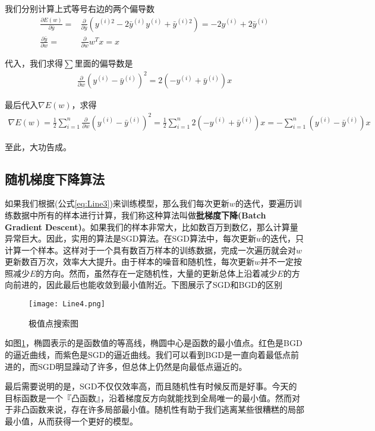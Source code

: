 我们分别计算上式等号右边的两个偏导数
\begin{align*}
	\frac{\partial{E({w})}}{\partial\bar{y}}=
	 & \frac{\partial}{\partial\bar{y}}(y^{(i)2}-2\bar{y}^{(i)}y^{(i)}+\bar{y}^{(i)2}) = -2y^{(i)}+2\bar{y}^{(i)} \\
	\frac{\partial{\bar{y}}}{\partial{w}}=
	 & \frac{\partial}{\partial{w}}{w}^T{x}= {x}
\end{align*}


代入，我们求得\(\sum\)里面的偏导数是
\begin{align*}
	\frac{\partial}{\partial{w}}(y^{(i)}-\bar{y}^{(i)})^2 = 2(-y^{(i)}+\bar{y}^{(i)}){x}
\end{align*}


最后代入\(\nabla{E}({w})\)，求得
\begin{align*}
	\nabla{E({w})} =\frac{1}{2}\sum_{i=1}^{n}\frac{\partial}{\partial{w}}(y^{(i)}-\bar{y}^{(i)})^2 =\frac{1}{2}\sum_{i=1}^{n}2(-y^{(i)}+\bar{y}^{(i)}){x} =-\sum_{i=1}^{n}(y^{(i)}-\bar{y}^{(i)}){x}
\end{align*}


至此，大功告成。

\subsection{随机梯度下降算法}\label{Line:7}

如果我们根据(公式\ref{eq:Line3})来训练模型，那么我们每次更新\({w}\)的迭代，要遍历训练数据中所有的样本进行计算，我们称这种算法叫做\textbf{批梯度下降(Batch Gradient Descent)}。如果我们的样本非常大，比如数百万到数亿，那么计算量异常巨大。因此，实用的算法是SGD算法。在SGD算法中，每次更新\({w}\)的迭代，只计算一个样本。这样对于一个具有数百万样本的训练数据，完成一次遍历就会对\({w}\)更新数百万次，效率大大提升。由于样本的噪音和随机性，每次更新\({w}\)并不一定按照减少\(E\)的方向。然而，虽然存在一定随机性，大量的更新总体上沿着减少\(E\)的方向前进的，因此最后也能收敛到最小值附近。下图展示了SGD和BGD的区别

\begin{figure}[htbp]
	\centering
	\texttt{[image: Line4.png]}
	\caption{极值点搜索图}
	\label{fig:Line4}
\end{figure}

如图\ref{fig:Line4}，椭圆表示的是函数值的等高线，椭圆中心是函数的最小值点。红色是BGD的逼近曲线，而紫色是SGD的逼近曲线。我们可以看到BGD是一直向着最低点前进的，而SGD明显躁动了许多，但总体上仍然是向最低点逼近的。

最后需要说明的是，SGD不仅仅效率高，而且随机性有时候反而是好事。今天的目标函数是一个『凸函数』，沿着梯度反方向就能找到全局唯一的最小值。然而对于非凸函数来说，存在许多局部最小值。随机性有助于我们逃离某些很糟糕的局部最小值，从而获得一个更好的模型。



